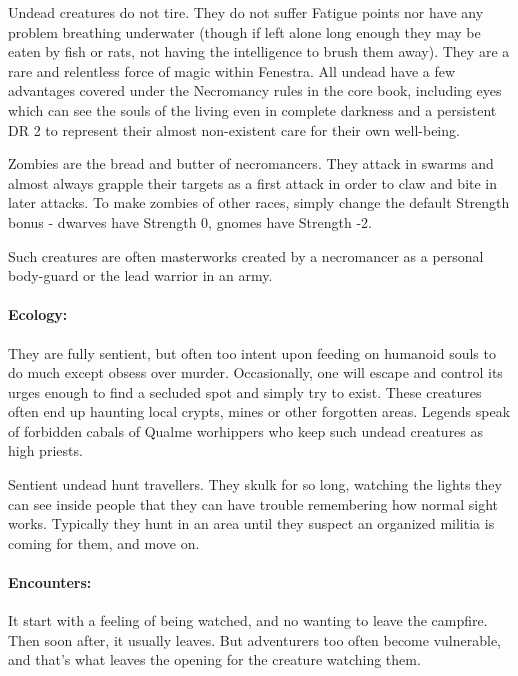 Undead creatures do not tire.  They do not suffer Fatigue points nor have any problem breathing underwater (though if left alone long enough they may be eaten by fish or rats, not having the intelligence to brush them away).  They are a rare and relentless force of magic within Fenestra.  All undead have a few advantages covered under the Necromancy rules in the core book, including eyes which can see the souls of the living even in complete darkness and a persistent DR 2 to represent their almost non-existent care for their own well-being.

\label{zombie}
\zombie

Zombies are the bread and butter of necromancers.  They attack in swarms and almost always grapple their targets as a first attack in order to claw and bite in later attacks.  To make zombies of other races, simply change the default Strength bonus - dwarves have Strength 0, gnomes have Strength -2.

\label{undead_knight}


Such creatures are often masterworks created by a necromancer as a personal body-guard or the lead warrior in an army.

\undeadknight

\paragraph{Ecology:} They are fully sentient, but often too intent upon feeding on humanoid souls to do much except obsess over murder.  Occasionally, one will escape and control its urges enough to find a secluded spot and simply try to exist.  These creatures often end up haunting local crypts, mines or other forgotten areas.  Legends speak of forbidden cabals of Qualme worhippers who keep such undead creatures as high priests.

Sentient undead hunt travellers.  They skulk for so long, watching the lights they can see inside people that they can have trouble remembering how normal sight works.  Typically they hunt in an area until they suspect an organized militia is coming for them, and move on.

\paragraph{Encounters:}  It start with a feeling of being watched, and no wanting to leave the campfire.  Then soon after, it usually leaves.  But adventurers too often become vulnerable, and that's what leaves the opening for the creature watching them.


